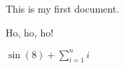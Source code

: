 \documentclass{article}
\begin{document}
This is my first document.

Ho, ho, ho!

$\sin(8) + \sum_{i=1}^{n} i$
\end{document}
